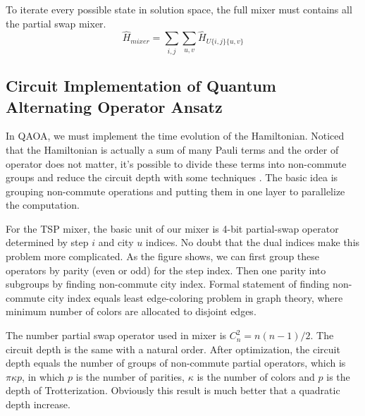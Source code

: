 \documentclass[aps,pra,twocolumn,superscriptaddress]{revtex4-2}
\begin{document}
To iterate every possible state in solution space, the full mixer must contains all the partial swap mixer.
$$
\hat H_{mixer}=\sum_{i,j}\sum_{u,v}\hat H_{U\{i,j\}\{u,v\}}
$$
\subsection{Circuit Implementation of Quantum Alternating Operator Ansatz}
In QAOA, we must implement the time evolution of the Hamiltonian. Noticed that the Hamiltonian is actually a sum of many Pauli terms and the order of operator does not matter, it's possible to divide these terms into non-commute groups and reduce the circuit depth with some techniques \cite{}. The basic idea is grouping non-commute operations and putting them in one layer to parallelize the computation. 

For the TSP mixer, the basic unit of our mixer is 4-bit partial-swap operator determined by step $i$ and city $u$ indices. No doubt that the dual indices make this problem more complicated. As the figure shows, we can first group these operators by parity (even or odd) for the step index. Then one parity into subgroups by finding non-commute city index. Formal statement of finding non-commute city index equals least edge-coloring problem in graph theory, where minimum number of colors are allocated to disjoint edges.

The number partial swap operator used in mixer is $C^2_n=n(n-1)/2$. The circuit depth is the same with a natural order. After optimization, the circuit depth equals the number of groups of non-commute partial operators, which is $\pi \kappa p$, in which $p$ is the number of parities, $\kappa$ is the number of colors and $p$ is the depth of Trotterization. Obviously this result is much better that a quadratic depth increase.
\end{document}
